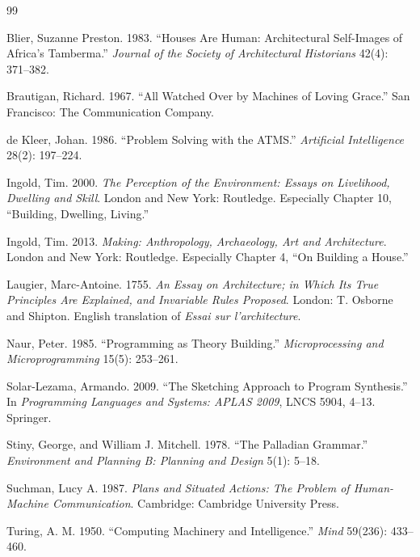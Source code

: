 \documentclass[11pt]{article}
\begin{document}
\begin{thebibliography}{99}

Blier, Suzanne Preston. 1983. ``Houses Are Human: Architectural Self-Images of Africa's Tamberma.'' \emph{Journal of the Society of Architectural Historians} 42(4): 371--382.

Brautigan, Richard. 1967. ``All Watched Over by Machines of Loving Grace.'' San Francisco: The Communication Company.

de Kleer, Johan. 1986. ``Problem Solving with the ATMS.'' \emph{Artificial Intelligence} 28(2): 197--224.

Ingold, Tim. 2000. \emph{The Perception of the Environment: Essays on Livelihood, Dwelling and Skill}. London and New York: Routledge. Especially Chapter 10, ``Building, Dwelling, Living.''

Ingold, Tim. 2013. \emph{Making: Anthropology, Archaeology, Art and Architecture}. London and New York: Routledge. Especially Chapter 4, ``On Building a House.''

Laugier, Marc-Antoine. 1755. \emph{An Essay on Architecture; in Which Its True Principles Are Explained, and Invariable Rules Proposed}. London: T. Osborne and Shipton. English translation of \emph{Essai sur l'architecture}.

Naur, Peter. 1985. ``Programming as Theory Building.'' \emph{Microprocessing and Microprogramming} 15(5): 253--261.

Solar-Lezama, Armando. 2009. ``The Sketching Approach to Program Synthesis.'' In \emph{Programming Languages and Systems: APLAS 2009}, LNCS 5904, 4--13. Springer.

Stiny, George, and William J. Mitchell. 1978. ``The Palladian Grammar.'' \emph{Environment and Planning B: Planning and Design} 5(1): 5--18.

Suchman, Lucy A. 1987. \emph{Plans and Situated Actions: The Problem of Human-Machine Communication}. Cambridge: Cambridge University Press.

Turing, A. M. 1950. ``Computing Machinery and Intelligence.'' \emph{Mind} 59(236): 433--460.

\end{thebibliography}
\end{document}
